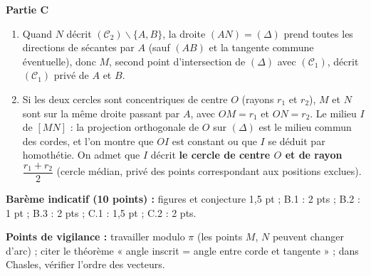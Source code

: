 \documentclass[11pt]{article}
\def\setminus{\mathbin{\backslash}}\let\smallsetminus\setminus
\begin{document}
\begin{corrige}
\textbf{Partie C}
\begin{enumerate}
\item Quand $N$ décrit $(\mathcal{C}_2) \setminus \{A, B\}$, la droite $(AN) = (\Delta)$ prend toutes les directions de sécantes par $A$ (sauf $(AB)$ et la tangente commune éventuelle), donc $M$, second point d'intersection de $(\Delta)$ avec $(\mathcal{C}_1)$, décrit $(\mathcal{C}_1)$ privé de $A$ et $B$.
\item Si les deux cercles sont concentriques de centre $O$ (rayons $r_1$ et $r_2$), $M$ et $N$ sont sur la même droite passant par $A$, avec $OM = r_1$ et $ON = r_2$. Le milieu $I$ de $[MN]$ : la projection orthogonale de $O$ sur $(\Delta)$ est le milieu commun des cordes, et l'on montre que $OI$ est constant ou que $I$ se déduit par homothétie. On admet que $I$ décrit \textbf{le cercle de centre $O$ et de rayon $\dfrac{r_1 + r_2}{2}$} (cercle médian, privé des points correspondant aux positions exclues).
\end{enumerate}

\textbf{Barème indicatif (10 points) :} figures et conjecture 1,5 pt ; B.1 : 2 pts ; B.2 : 1 pt ; B.3 : 2 pts ; C.1 : 1,5 pt ; C.2 : 2 pts.

\textbf{Points de vigilance :} travailler modulo $\pi$ (les points $M$, $N$ peuvent changer d'arc) ; citer le théorème « angle inscrit = angle entre corde et tangente » ; dans Chasles, vérifier l'ordre des vecteurs.
\end{corrige}
\end{document}
